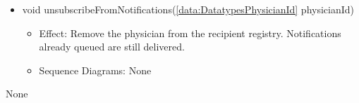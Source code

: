 \begin{description}
\begin{itemize}[noitemsep,nolistsep,leftmargin=-.25cm]
\begin{itemize}[noitemsep,nolistsep]
           \item Sequence Diagrams: None
        \end{itemize}
      \item \textsf{void unsubscribeFromNotifications(\ref{data:DatatypesPhysicianId} physicianId)}
        \begin{itemize}[noitemsep,nolistsep]
           \item Effect: Remove the physician from the recipient registry. Notifications already queued are still delivered. 
           \item Sequence Diagrams: None
        \end{itemize}
    \end{itemize}
      \item[Diagrams:] None
    \end{description}

